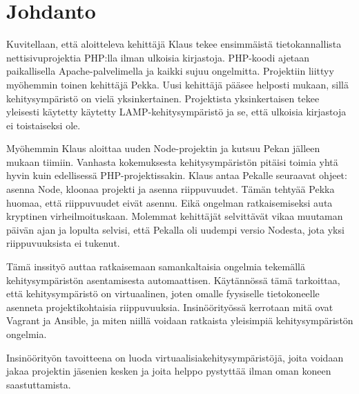 \chapter{Johdanto}

Kuvitellaan, että aloitteleva kehittäjä Klaus tekee ensimmäistä tietokannallista nettisivuprojektia PHP:lla ilman ulkoisia kirjastoja. PHP-koodi ajetaan paikallisella Apache-palvelimella ja kaikki sujuu ongelmitta. Projektiin liittyy myöhemmin toinen kehittäjä Pekka. Uusi kehittäjä pääsee helposti mukaan, sillä kehitysympäristö on vielä yksinkertainen. Projektista yksinkertaisen tekee yleisesti käytetty käytetty LAMP-kehitysympäristö ja se, että ulkoisia kirjastoja ei toistaiseksi ole.

Myöhemmin Klaus aloittaa uuden Node-projektin ja kutsuu Pekan jälleen mukaan tiimiin. Vanhasta kokemuksesta kehitysympäristön pitäisi toimia yhtä hyvin kuin edellisessä PHP-projektissakin. Klaus antaa Pekalle seuraavat ohjeet: asenna Node, kloonaa projekti ja asenna riippuvuudet. Tämän tehtyää Pekka huomaa, että riippuvuudet eivät asennu. Eikä ongelman ratkaisemiseksi auta kryptinen virheilmoituskaan. Molemmat kehittäjät selvittävät vikaa muutaman päivän ajan ja lopulta selvisi, että Pekalla oli uudempi versio Nodesta, jota yksi riippuvuuksista ei tukenut.

Tämä inssityö auttaa ratkaisemaan samankaltaisia ongelmia tekemällä  kehitysympäristön asentamisesta automaattisen. Käytännössä tämä tarkoittaa, että kehitysympäristö on virtuaalinen, joten omalle fyysiselle tietokoneelle asenneta projektikohtaisia riippuvuuksia. Insinöörityössä kerrotaan mitä ovat Vagrant ja Ansible, ja miten niillä voidaan ratkaista yleisimpiä kehitysympäristön ongelmia.

Insinöörityön tavoitteena on luoda virtuaalisiakehitysympäristöjä, joita voidaan jakaa projektin jäsenien kesken ja joita helppo pystyttää ilman oman koneen saastuttamista.
